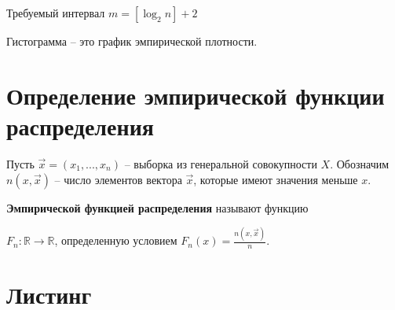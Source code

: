 \documentclass[a4paper,oneside,12pt]{extreport}
\theoremstyle{indented}
\begin{document}
    \hfill
    
    Требуемый интервал $m=[\log_2n] +2$
    
    \hfill

Гистограмма -- это график эмпирической плотности. 

\section{Определение эмпирической функции распределения}

\hfill 

Пусть $\vec x = (x_1, ..., x_n)$ -- выборка из генеральной совокупности $X$. Обозначим $n(x, \vec x)$ -- число элементов вектора $\vec x$, которые имеют значения меньше $x$.

\hfill

\textbf{Эмпирической функцией распределения} называют функцию 

$F_n : \mathbb{R} \to \mathbb{R}$, определенную условием $F_n(x) = \frac{n(x, \vec x)}{n}$. 

\section{Листинг}
\end{document}
